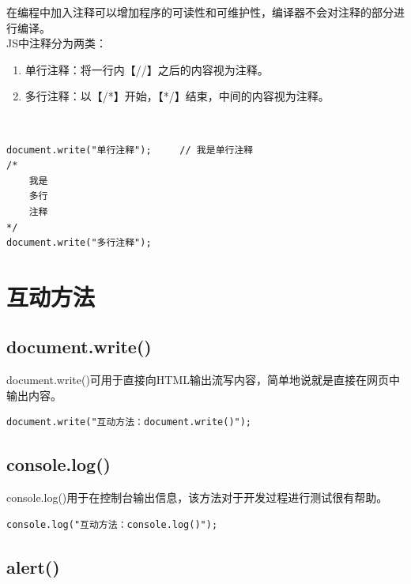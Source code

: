 在编程中加入注释可以增加程序的可读性和可维护性，编译器不会对注释的部分进行编译。 \\

JS中注释分为两类：

\begin{enumerate}
	\item 单行注释：将一行内【//】之后的内容视为注释。
	\item 多行注释：以【/*】开始，【*/】结束，中间的内容视为注释。
\end{enumerate}

 \\

\begin{lstlisting}[style=htmlcssjs]
document.write("单行注释");     // 我是单行注释
/*
    我是
    多行
    注释
*/
document.write("多行注释");
\end{lstlisting}

\newpage

\section{互动方法}

\subsection{document.write()}

document.write()可用于直接向HTML输出流写内容，简单地说就是直接在网页中输出内容。 \\

\begin{lstlisting}[style=htmlcssjs]
document.write("互动方法：document.write()");
\end{lstlisting}

\subsection{console.log()}

console.log()用于在控制台输出信息，该方法对于开发过程进行测试很有帮助。 \\

\begin{lstlisting}[style=htmlcssjs]
console.log("互动方法：console.log()");
\end{lstlisting}

\subsection{alert()}

